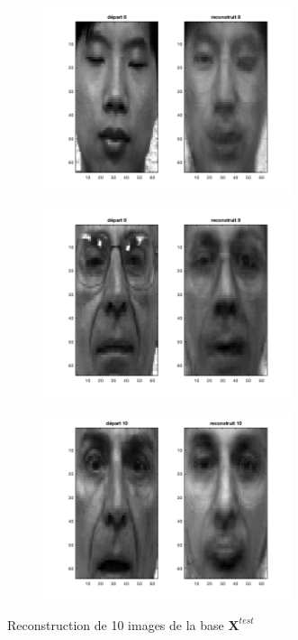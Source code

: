 \documentclass[a4paper]{article}
\begin{document}
\begin{figure}[H]
\begin{subfigure}[c]{0.24\textwidth}
    \end{subfigure}    
    \begin{subfigure}[c]{0.24\textwidth}
        \centering
        \includegraphics[width=0.8\textwidth]{images/ex5_face8.png}
    \end{subfigure}    

    \begin{subfigure}[c]{0.24\textwidth}
        \centering
        \includegraphics[width=0.8\textwidth]{images/ex5_face9.png}
    \end{subfigure}    
    \begin{subfigure}[c]{0.24\textwidth}
        \centering
        \includegraphics[width=0.8\textwidth]{images/ex5_face10.png}
    \end{subfigure}    

    \caption{Reconstruction de 10 images de la base $\mathbf{X}^{test}$} 
    \label{fig:ex5-rec-faces}
\end{figure}
\end{document}
